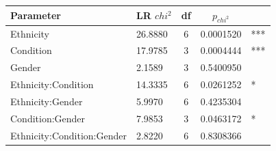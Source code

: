 \documentclass{frontiersSCNS} %
\begin{document}
\begin{table}[h!]
\centering
\begin{tabular}{ l l c c l }
 
 Parameter & LR $chi^2$ & df & $p_{chi^2}$ &  \\ 
 \hline
 
 Ethnicity & 26.8880 & 6 & 0.0001520 & ***\\ 

 Condition & 17.9785 & 3 & 0.0004444 & ***\\ 

 Gender & 2.1589 & 3 & 0.5400950 & \\ 

 Ethnicity:Condition & 14.3335 & 6 & 0.0261252 & *\\ 

 Ethnicity:Gender & 5.9970 & 6 & 0.4235304 &\\ 

 Condition:Gender & 7.9853 & 3 & 0.0463172 & *\\ 
 
 Ethnicity:Condition:Gender & 2.8220 & 6 & 0.8308366 & \\ 

\end{tabular}
\label{tab:LRT}
\end{table}
\end{document}
